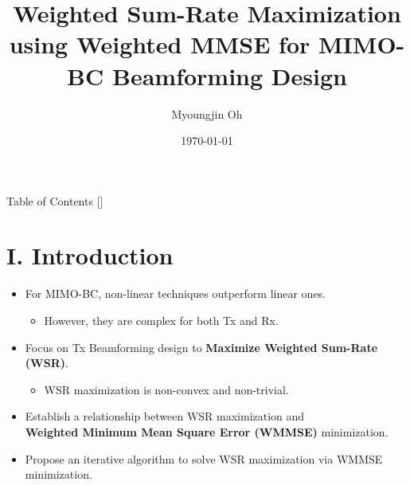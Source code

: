 \documentclass[aspectratio=169, 10pt]{beamer}
\title{Weighted Sum-Rate Maximization \\
using Weighted MMSE for MIMO-BC Beamforming Design}
\author{Myoungjin Oh}
\institute{School of Electrical Engineering, Korea University}
\date{\today}
\begin{document}
\begin{frame}
    \titlepage
    \vspace*{-47pt}
\end{frame}


\begin{frame}{Table of Contents}
    []
    \tableofcontents
\end{frame}

\section{I. Introduction}
\OnlyTitle
\begin{frame}{\insertsectionhead}
    \begin{itemize}
        \setlength{\itemsep}{1.5em}
        \item For MIMO-BC, non-linear techniques outperform linear ones.
              \begin{itemize}
                  \item However, they are complex for both Tx and Rx.
              \end{itemize}

        \item Focus on Tx Beamforming design to \textbf{Maximize Weighted Sum-Rate (WSR)}.
              \begin{itemize}
                  \item WSR maximization is non-convex and non-trivial.
              \end{itemize}
        \item Establish a relationship between WSR maximization and \\
              \textbf{Weighted Minimum Mean Square Error (WMMSE)} minimization.
        \item Propose an iterative algorithm to solve WSR maximization via WMMSE minimization.
    \end{itemize}
\end{frame}
\end{document}
